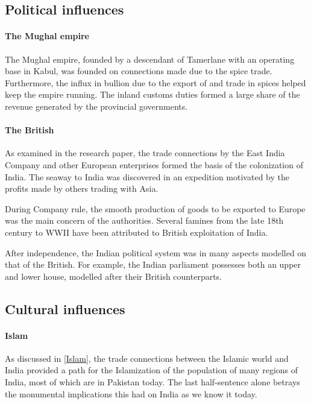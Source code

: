 \documentclass[11pt, a4paper, headings=standardclasses]{scrartcl}
\begin{document}
\subsection{Political influences}
\paragraph{The Mughal empire}

The Mughal empire, founded by a descendant of Tamerlane\autocite[6]{richards} with an operating base in Kabul, was founded on connections made due to the spice trade. Furthermore, the influx in bullion due to the export of and trade in spices helped keep the empire running. The inland customs duties formed a large share of the revenue generated by the provincial governments.\autocite[257]{RF}

\paragraph{The British}

As examined in the research paper, the trade connections by the East India Company and other European enterprises formed the basis of the colonization of India. The seaway to India was discovered in an expedition motivated by the profits made by others trading with Asia.

During Company rule, the smooth production of goods to be exported to Europe was the main concern of the authorities. Several famines from the late 18th century to WWII have been attributed to British exploitation of India.\autocite{td}

After independence, the Indian political system was in many aspects modelled on that of the British. For example, the Indian parliament possesses both an upper and lower house, modelled after their British counterparts.

\subsection{Cultural influences}
\paragraph{Islam}
As discussed in \ref{Islam}, the trade connections between the Islamic world and India provided a path for the Islamization of the population of many regions of India, most of which are in Pakistan today. The last half-sentence alone betrays the monumental implications this had on India as we know it today.
\end{document}
